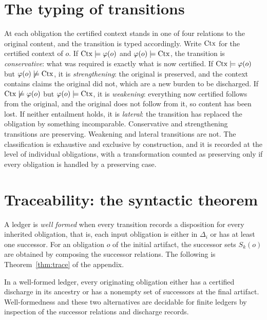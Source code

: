 \section{The typing of transitions}

At each obligation the certified context stands in one of four relations to the original content, and the transition is typed accordingly. Write $\operatorname{Ctx}$ for the certified context of $o$. If $\operatorname{Ctx} \models \varphi(o)$ and $\varphi(o) \models \operatorname{Ctx}$, the transition is \emph{conservative}: what was required is exactly what is now certified. If $\operatorname{Ctx} \models \varphi(o)$ but $\varphi(o) \not\models \operatorname{Ctx}$, it is \emph{strengthening}: the original is preserved, and the context contains claims the original did not, which are a new burden to be discharged. If $\operatorname{Ctx} \not\models \varphi(o)$ but $\varphi(o) \models \operatorname{Ctx}$, it is \emph{weakening}: everything now certified follows from the original, and the original does not follow from it, so content has been lost. If neither entailment holds, it is \emph{lateral}: the transition has replaced the obligation by something incomparable. Conservative and strengthening transitions are preserving. Weakening and lateral transitions are not. The classification is exhaustive and exclusive by construction, and it is recorded at the level of individual obligations, with a transformation counted as preserving only if every obligation is handled by a preserving case.

\section{Traceability: the syntactic theorem}

A ledger is \emph{well formed} when every transition records a disposition for every inherited obligation, that is, each input obligation is either in $\Delta_i$ or has at least one successor. For an obligation $o$ of the initial artifact, the successor sets $S_k(o)$ are obtained by composing the successor relations. The following is Theorem~\ref{thm:trace} of the appendix.

\begin{theorem}[RV-020]
In a well-formed ledger, every originating obligation either has a certified discharge in its ancestry or has a nonempty set of successors at the final artifact. Well-formedness and these two alternatives are decidable for finite ledgers by inspection of the successor relations and discharge records.
\end{theorem}

